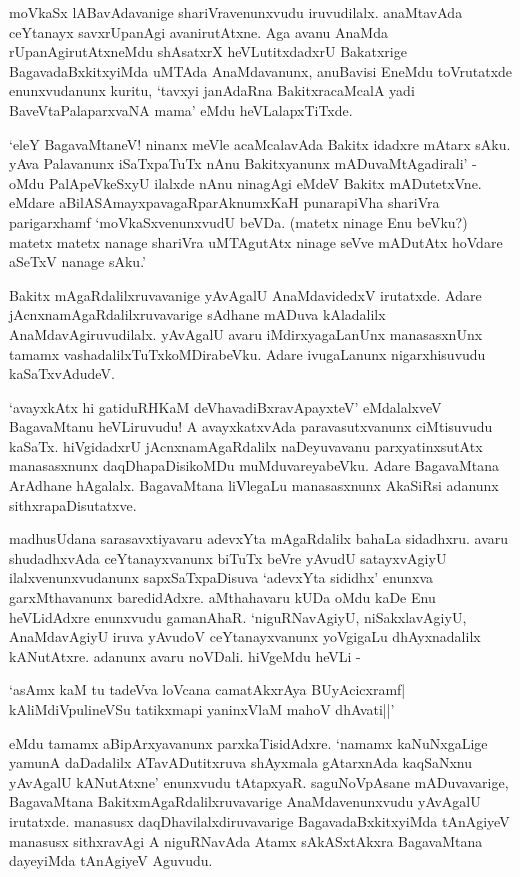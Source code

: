 moVkaSx lABavAdavanige shariVravenunxvudu iruvudilalx. anaMtavAda ceYtanayx savxrUpanAgi avanirutAtxne. Aga avanu AnaMda rUpanAgirutAtxneMdu 
shAsatxrX heVLutitxdadxrU Bakatxrige BagavadaBxkitxyiMda uMTAda AnaMdavanunx, anuBavisi EneMdu toVrutatxde enunxvudanunx kuritu, 
`tavxyi janAdaRna BakitxracaMcalA yadi BaveVtaPalaparxvaNA mama' eMdu heVLalapxTiTxde.

`eleY BagavaMtaneV! ninanx meVle acaMcalavAda Bakitx idadxre mAtarx sAku. yAva Palavanunx iSaTxpaTuTx nAnu Bakitxyanunx mADuvaMtAgadirali' - oMdu 
PalApeVkeSxyU ilalxde nAnu ninagAgi eMdeV Bakitx mADutetxVne. eMdare 
aBilASAmayxpavagaRparAknumxKaH punarapiVha shariVra parigarxhamf `moVkaSxvenunxvudU beVDa. (matetx ninage Enu beVku?) matetx matetx nanage shariVra uMTAgutAtx ninage seVve mADutAtx hoVdare aSeTxV nanage sAku.'

Bakitx mAgaRdalilxruvavanige yAvAgalU AnaMdavidedxV irutatxde. Adare jAcnxnamAgaRdalilxruvavarige sAdhane mADuva kAladalilx AnaMdavAgiruvudilalx. 
yAvAgalU avaru iMdirxyagaLanUnx manasasxnUnx tamamx vashadalilxTuTxkoMDirabeVku. Adare ivugaLanunx nigarxhisuvudu kaSaTxvAdudeV.

`avayxkAtx hi gatiduRHKaM deVhavadiBxravApayxteV' eMdalalxveV BagavaMtanu heVLiruvudu! A avayxkatxvAda paravasutxvanunx ciMtisuvudu kaSaTx. hiVgidadxrU jAcnxnamAgaRdalilx 
naDeyuvavanu parxyatinxsutAtx manasasxnunx daqDhapaDisikoMDu muMduvareyabeVku. Adare BagavaMtana ArAdhane hAgalalx. 
BagavaMtana liVlegaLu manasasxnunx AkaSiRsi adanunx sithxrapaDisutatxve.

madhusUdana sarasavxtiyavaru adevxYta mAgaRdalilx bahaLa sidadhxru. avaru shudadhxvAda ceYtanayxvanunx biTuTx beVre yAvudU satayxvAgiyU ilalxvenunxvudanunx 
sapxSaTxpaDisuva `adevxYta sididhx' enunxva garxMthavanunx baredidAdxre. aMthahavaru kUDa oMdu kaDe Enu heVLidAdxre enunxvudu gamanAhaR. `niguRNavAgiyU, 
niSakxlavAgiyU, AnaMdavAgiyU iruva yAvudoV ceYtanayxvanunx yoVgigaLu dhAyxnadalilx kANutAtxre. adanunx avaru noVDali. hiVgeMdu heVLi -

\begin{shloka}
`asAmx kaM tu tadeVva loVcana camatAkxrAya BUyAcicxramf|\\
kAliMdiVpulineVSu tatikxmapi yaninxVlaM mahoV dhAvati||'
\end{shloka}

eMdu tamamx aBipArxyavanunx parxkaTisidAdxre. `namamx kaNuNxgaLige yamunA daDadalilx ATavADutitxruva shAyxmala gAtarxnAda kaqSaNxnu yAvAgalU kANutAtxne' enunxvudu 
tAtapxyaR. saguNoVpAsane mADuvavarige, BagavaMtana BakitxmAgaRdalilxruvavarige AnaMdavenunxvudu yAvAgalU irutatxde. manasusx daqDhavilalxdiruvavarige 
BagavadaBxkitxyiMda tAnAgiyeV manasusx sithxravAgi A niguRNavAda Atamx sAkASxtAkxra BagavaMtana dayeyiMda tAnAgiyeV Aguvudu.


